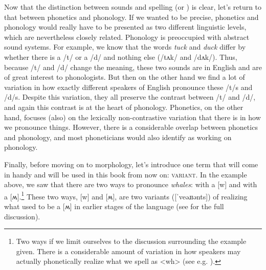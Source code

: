 Now that the distinction between sounds and spelling (or ) is clear, let's return to that between phonetics and phonology. If we wanted to be precise, phonetics and phonology would really have to be presented as two different linguistic levels, which are nevertheless closely related. Phonology is preoccupied with abstract sound systems. For example, we know that the words \emph{tuck} and \emph{duck} differ by whether there is a /t/ or a /d/ and nothing else (/tʌk/ and /dʌk/). Thus, because /t/ and /d/ change the  meaning, these two sounds are  in English and are of great interest to phonologists. But then on the other hand we find a lot of variation in how exactly different speakers of English pronounce these /t/s and /d/s. Despite this variation, they all preserve the contrast between /t/ and /d/, and again this contrast is at the heart of phonology. Phonetics, on the other hand, focuses (also) on the lexically non-contrastive variation that there is in how we pronounce things. However, there is a considerable overlap between phonetics and phonology, and most phoneticians would also identify as working on phonology.

Finally, before moving on to morphology, let's introduce one term that will come in handy and will be used in this book from now on: \textsc{variant}. In the example above, we saw that there are two ways to pronounce \emph{whales}: with a [w] and with a [ʍ].\footnote{Two ways if we limit ourselves to the discussion surrounding the example given. There is a considerable amount of variation in how speakers may actually phonetically realize what we spell as  <wh> (see e.g. \citealp{Kolísková2016}).} These two ways, [w] and [ʍ], are two variants ([ˈveəɹɪənts]) of realizing what used to be a [ʍ] in earlier stages of the language (see  for the full discussion).

